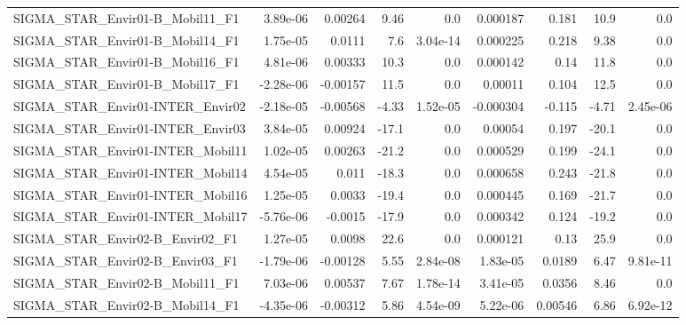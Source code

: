 \begin{tabular}{lrrrrrrrr}
SIGMA\_STAR\_Envir01-B\_Mobil11\_F1           &    3.89e-06 &      0.00264 &    9.46 &      0.0 &   0.000187 &       0.181 &         10.9 &           0.0 \\
SIGMA\_STAR\_Envir01-B\_Mobil14\_F1           &    1.75e-05 &       0.0111 &     7.6 & 3.04e-14 &   0.000225 &       0.218 &         9.38 &           0.0 \\
SIGMA\_STAR\_Envir01-B\_Mobil16\_F1           &    4.81e-06 &      0.00333 &    10.3 &      0.0 &   0.000142 &        0.14 &         11.8 &           0.0 \\
SIGMA\_STAR\_Envir01-B\_Mobil17\_F1           &   -2.28e-06 &     -0.00157 &    11.5 &      0.0 &    0.00011 &       0.104 &         12.5 &           0.0 \\
SIGMA\_STAR\_Envir01-INTER\_Envir02          &   -2.18e-05 &     -0.00568 &   -4.33 & 1.52e-05 &  -0.000304 &      -0.115 &        -4.71 &      2.45e-06 \\
SIGMA\_STAR\_Envir01-INTER\_Envir03          &    3.84e-05 &      0.00924 &   -17.1 &      0.0 &    0.00054 &       0.197 &        -20.1 &           0.0 \\
SIGMA\_STAR\_Envir01-INTER\_Mobil11          &    1.02e-05 &      0.00263 &   -21.2 &      0.0 &   0.000529 &       0.199 &        -24.1 &           0.0 \\
SIGMA\_STAR\_Envir01-INTER\_Mobil14          &    4.54e-05 &        0.011 &   -18.3 &      0.0 &   0.000658 &       0.243 &        -21.8 &           0.0 \\
SIGMA\_STAR\_Envir01-INTER\_Mobil16          &    1.25e-05 &       0.0033 &   -19.4 &      0.0 &   0.000445 &       0.169 &        -21.7 &           0.0 \\
SIGMA\_STAR\_Envir01-INTER\_Mobil17          &   -5.76e-06 &      -0.0015 &   -17.9 &      0.0 &   0.000342 &       0.124 &        -19.2 &           0.0 \\
SIGMA\_STAR\_Envir02-B\_Envir02\_F1           &    1.27e-05 &       0.0098 &    22.6 &      0.0 &   0.000121 &        0.13 &         25.9 &           0.0 \\
SIGMA\_STAR\_Envir02-B\_Envir03\_F1           &   -1.79e-06 &     -0.00128 &    5.55 & 2.84e-08 &   1.83e-05 &      0.0189 &         6.47 &      9.81e-11 \\
SIGMA\_STAR\_Envir02-B\_Mobil11\_F1           &    7.03e-06 &      0.00537 &    7.67 & 1.78e-14 &   3.41e-05 &      0.0356 &         8.46 &           0.0 \\
SIGMA\_STAR\_Envir02-B\_Mobil14\_F1           &   -4.35e-06 &     -0.00312 &    5.86 & 4.54e-09 &   5.22e-06 &     0.00546 &         6.86 &      6.92e-12 \\

\end{tabular}
